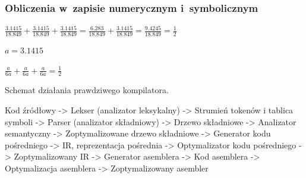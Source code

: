 \documentclass[10pt,t]{beamer}
\begin{document}
\begin{frame}
  \frametitle{Obliczenia w~zapisie numerycznym i~symbolicznym}


  $\displaystyle \frac{ 3.1415 }{ 18.849 } + \frac{ 3.1415 }{ 18.849 } +
  \frac{ 3.1415 }{ 18.849 } = \frac{ 6.283 }{ 18.849 } +
  \frac{ 3.1415 }{ 18.849 } = \frac{ 9.4245 }{ 18.849 } = \frac{ 1 }{ 2 }$

  \vspace{1em}


  $a = 3.1415$

  $\displaystyle \frac{ a }{ 6a } + \frac{ a }{ 6a } + \frac{ a }{ 6a } =
  \frac{ 1 } { 2 }$

  Schemat działania prawdziwego kompilatora.

  Kod źródłowy -> Lekser (analizator leksykalny) -> Strumień tokenów i
  tablica symboli -> Parser (analizator składniowy) -> Drzewo
  składniowe -> Analizator semantyczny -> Zoptymalizowane drzewo składniowe
  -> Generator kodu pośredniego -> IR, reprezentacja pośrednia ->
  Optymalizator kodu pośredniego -> Zoptymalizowany IR -> Generator
  asemblera -> Kod asemblera -> Optymalizacja asemblera ->
  Zoptymalizowany asembler

\end{frame}












\end{document}
